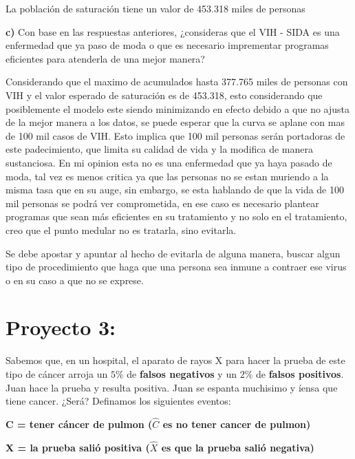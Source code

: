 \documentclass{article}
\begin{document}
\vspace{10pt}

La población de saturación tiene un valor de 453.318 miles de personas

\vspace{10pt}

\textbf{c)} Con base en las respuestas anteriores, ¿consideras que el VIH - SIDA es una enfermedad que ya paso de moda o que es necesario imprementar programas eficientes para atenderla de una mejor manera?


\vspace{10pt}

Considerando que el maximo de acumulados hasta 377.765 miles de personas con VIH y el valor esperado de saturación es de 453.318, esto considerando que posiblemente el modelo este siendo minimizando en efecto debido a que no ajusta de la mejor manera a los datos, se puede esperar que la curva se aplane con mas de 100 mil casos de VIH. Esto implica que 100 mil personas serán portadoras de este padecimiento, que limita su calidad de vida y la modifica de manera sustanciosa. En mi opinion esta no es una enfermedad que ya haya pasado de moda, tal vez es menos critica ya que las personas no se estan muriendo a la misma tasa que en su auge, sin embargo, se esta hablando de que la vida de 100 mil personas se podrá ver comprometida, en ese caso es necesario plantear programas que sean más eficientes en su tratamiento y no solo en el tratamiento, creo que el punto medular no es tratarla, sino evitarla. 

\vspace{10pt}

Se debe apostar y apuntar al hecho de evitarla de alguna manera, buscar algun tipo de procedimiento que haga que una persona sea inmune a contraer ese virus o en su caso a que no se exprese. 


\section*{Proyecto 3:}


Sabemos que, en un hospital, el aparato de rayos X para hacer la prueba de este tipo de cáncer arroja un $5 \%$ de \textbf{falsos negativos} y un $2 \%$ de \textbf{falsos positivos}. Juan hace la prueba y resulta positiva. Juan se espanta muchisimo y íensa que tiene cancer. ¿Será? Definamos los siguientes eventos: 

\begin{center}
    \textbf{C = tener cáncer de pulmon ($\hat{C}$ es no tener cancer de pulmon)}

    \vspace{10pt}

    \textbf{X = la prueba salió positiva ($\hat{X}$ es que la prueba salió negativa)}
\end{center}
\end{document}
